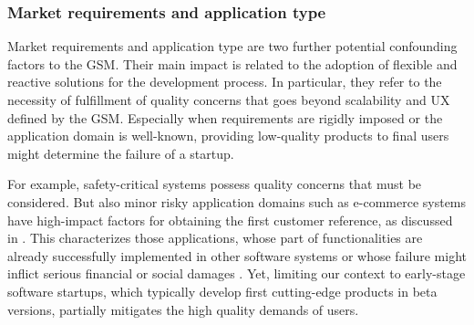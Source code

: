 \documentclass[10pt,journal,letterpaper,compsoc]{IEEEtran}
\begin{document}
\subsubsection{Market requirements and application type} 
Market requirements \cite{Coleman2007} and application type \cite{Sutton2000, Coleman2008, Coleman2008a} are two further potential confounding factors to the GSM. Their main impact is related to the adoption of flexible and reactive solutions for the development process. In particular, they refer to the necessity of fulfillment of quality concerns that goes beyond scalability and UX defined by the GSM. Especially when requirements are rigidly imposed or the application domain is well-known, providing low-quality products to final users might determine the failure of a startup. 

For example, safety-critical systems possess quality concerns that must be considered. But also minor risky application domains such as e-commerce systems have high-impact factors for obtaining the first customer reference,%
 as discussed in \cite{Deakins2005,Kim2005,Silva2005}. This%
 characterizes those applications, whose part of functionalities are already successfully implemented in other software systems or whose failure might inflict serious financial or social damages \cite{Bass2003}. Yet, limiting our context to early-stage software startups, which typically develop first cutting-edge products in beta versions, partially mitigates the high quality demands of users.
\end{document}
